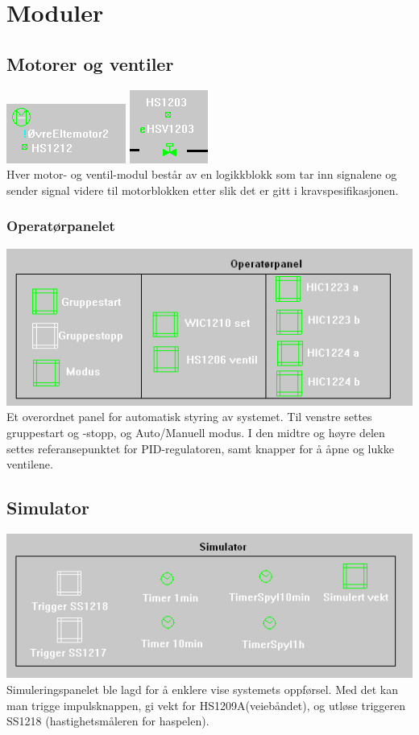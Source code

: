 \section{Moduler}
\subsection{Motorer og ventiler}
	\includegraphics[scale=1.2]{motmod2.jpg}
	\includegraphics[scale=1.2]{ventmod2.jpg}
	\\Hver motor- og ventil-modul består av en logikkblokk som tar inn signalene og sender signal videre til motorblokken etter slik det er gitt i kravspesifikasjonen.

\subsubsection{Operatørpanelet}
	\includegraphics[width=\textwidth]{op2.jpg}
	Et overordnet panel for automatisk styring av systemet. Til venstre settes gruppestart og -stopp, og Auto/Manuell modus. I den midtre og høyre delen settes referansepunktet for PID-regulatoren, samt knapper for å åpne og lukke ventilene.

\subsection{Simulator}
	\includegraphics[width=\textwidth]{simulator2.jpg}
	Simuleringspanelet ble lagd for å enklere vise systemets oppførsel. Med det kan man trigge impulsknappen, gi vekt for HS1209A(veiebåndet), og utløse triggeren SS1218 (hastighetsmåleren for haspelen).
